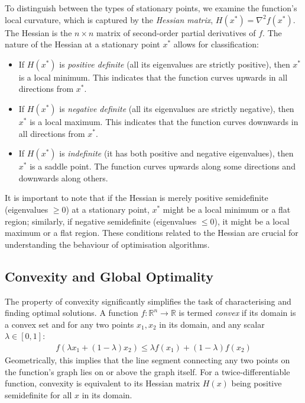 To distinguish between the types of stationary points, we examine the function's local curvature, which is captured by the \textit{Hessian matrix}, $H(x^*) = \nabla^2 f(x^*)$. The Hessian is the $n \times n$ matrix of second-order partial derivatives of $f$. The nature of the Hessian at a stationary point $x^*$ allows for classification:
\begin{itemize}
    \item If $H(x^*)$ is \textit{positive definite} (all its eigenvalues are strictly positive), then $x^*$ is a local minimum. This indicates that the function curves upwards in all directions from $x^*$.
    \item If $H(x^*)$ is \textit{negative definite} (all its eigenvalues are strictly negative), then $x^*$ is a local maximum. This indicates that the function curves downwards in all directions from $x^*$.
    \item If $H(x^*)$ is \textit{indefinite} (it has both positive and negative eigenvalues), then $x^*$ is a saddle point. The function curves upwards along some directions and downwards along others.
\end{itemize}
It is important to note that if the Hessian is merely positive semidefinite (eigenvalues $\geq 0$) at a stationary point, $x^*$ might be a local minimum or a flat region; similarly, if negative semidefinite (eigenvalues $\leq 0$), it might be a local maximum or a flat region. These conditions related to the Hessian are crucial for understanding the behaviour of optimisation algorithms.

\subsection{Convexity and Global Optimality}
\label{ssec:convexity}

The property of convexity significantly simplifies the task of characterising and finding optimal solutions. A function $f: \mathbb{R}^n \to \mathbb{R}$ is termed \textit{convex} if its domain is a convex set and for any two points $x_1, x_2$ in its domain, and any scalar $\lambda \in [0, 1]$:
\begin{align}
    f(\lambda x_1 + (1-\lambda)x_2) \leq \lambda f(x_1) + (1-\lambda)f(x_2)
    \label{eq:convexity_definition}
\end{align}
Geometrically, this implies that the line segment connecting any two points on the function's graph lies on or above the graph itself. For a twice-differentiable function, convexity is equivalent to its Hessian matrix $H(x)$ being positive semidefinite for all $x$ in its domain.

